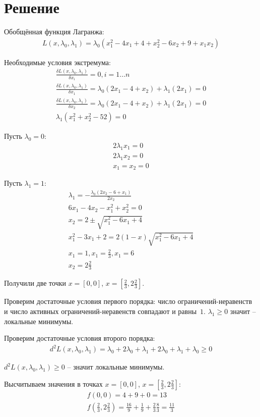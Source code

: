 \section{Решение}
Обобщённая функция Лагранжа:
\begin{gather}
    L(x, \lambda_0, \lambda_1) = \lambda_0(x_1^2 - 4x_1 + 4 + x_2^2 - 6x_2 + 9 + x_1x_2)\nonumber
\end{gather}

Необходимые условия экстремума:
\begin{gather}
    \frac{\delta L(x, \lambda_0, \lambda_1)}{\delta x_i} = 0, i = 1 \ldots n \nonumber \\
    \frac{\delta L(x, \lambda_0, \lambda_1)}{\delta x_1} = \lambda_0(2x_1 - 4 + x_2) + \lambda_1(2x_1) = 0 \nonumber \\
    \frac{\delta L(x, \lambda_0, \lambda_1)}{\delta x_2} = \lambda_0(2x_1 - 4 + x_2) + \lambda_1(2x_1) = 0 \nonumber \\
    \lambda_1(x_1^2 + x_2^2 - 52) = 0 \nonumber
\end{gather}

Пусть $\lambda_0 = 0$:
\begin{gather}
    2\lambda_1 x_1 = 0 \nonumber \\
    2\lambda_1 x_2 = 0 \nonumber \\
    x_1 = x_2 = 0 \nonumber
\end{gather}

Пусть $\lambda_1 = 1$:
\begin{gather}
    \lambda_1 = -\frac{\lambda_0(2x_2 - 6 + x_1)}{2x_2} \nonumber \\
    6x_1 - 4x_2 - x_1^2 + x_2^2 = 0 \nonumber \\
    x_2 = 2 \pm \sqrt{x_1^2 - 6x_1 + 4} \nonumber \\
    x_1^2 - 3x_1 + 2 = 2(1 - x)\sqrt{x_1^2 - 6x_1 + 4}\nonumber \\
    x_1 = 1, x_1 = \frac23, x_1 = 6 \nonumber \\
    x_2 = 2\frac23 \nonumber
\end{gather} 

Получили две точки $x = [0, 0]$, $x = [\frac23, 2\frac23]$.

Проверим достаточные условия первого порядка: 
число ограничений-неравенств и число активных ограничений-неравенств совпадают и равны~$1$.
$\lambda_1 \geq 0$ значит -- локальные минимумы.

Проверим достаточные условия второго порядка:
\begin{gather}
    d^2L(x, \lambda_0, \lambda_1) = \lambda_0 + 2\lambda_0 + \lambda_1 + 2\lambda_0 + \lambda_1 + \lambda_0 \geq 0 \nonumber
\end{gather} 

$d^2L(x, \lambda_0, \lambda_1) \geq 0$ -- значит локальные минимумы.

Высчитываем значения в точках $x = [0, 0]$, $x = [\frac23, 2\frac23]$:
\begin{gather}
    f(0, 0) = 4 + 9 + 0 = 13 \nonumber \\
    f(\frac23, 2\frac23) = \frac{16}9 + \frac19 + \frac23\frac83=\frac{11}3 \nonumber
\end{gather} 